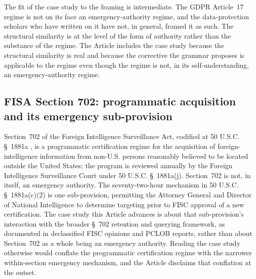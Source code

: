 The fit of the case study to the framing is intermediate.
The GDPR Article~17 regime is not on its face an emergency-authority regime, and the data-protection
scholars who have written on it have not, in general, framed it as such.
The structural similarity is at the level of the form of authority rather than the substance of the
regime.
The Article includes the case study because the structural similarity is real and because the
corrective the grammar proposes is applicable to the regime even though the regime is not, in its
self-understanding, an emergency-authority regime.

\subsection{FISA Section 702: programmatic acquisition and its emergency sub-provision}
\label{sec:cases:fisa702}

Section~702 of the Foreign Intelligence Surveillance Act, codified at 50 U.S.C. \S~1881a
\cite{ref_fisa_702_statute}, is a programmatic certification regime for the acquisition of
foreign-intelligence information from non-U.S. persons reasonably believed to be located outside the
United States; the program is reviewed annually by the Foreign Intelligence Surveillance Court under
50 U.S.C. \S~1881a(j).
Section~702 is not, in itself, an emergency authority.
The seventy-two-hour mechanism in 50 U.S.C. \S~1881a(c)(2) is one sub-provision, permitting the Attorney
General and Director of National Intelligence to determine targeting prior to FISC approval of a new
certification.
The case study this Article advances is about that sub-provision's interaction with the broader
\S~702 retention and querying framework, as documented in declassified FISC opinions and PCLOB reports,
rather than about Section~702 as a whole being an emergency authority.
Reading the case study otherwise would conflate the programmatic certification regime with the narrower
within-section emergency mechanism, and the Article disclaims that conflation at the outset.

